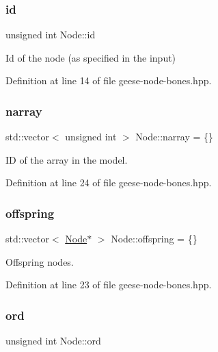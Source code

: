 \subsubsection{\texorpdfstring{id}{id}}
{\footnotesize\ttfamily unsigned int Node\+::id}



Id of the node (as specified in the input) 



Definition at line 14 of file geese-\/node-\/bones.\+hpp.

\mbox{\label{class_node_a9abaf3f1f5e9c5e383125946b04a15ac}} 
\subsubsection{\texorpdfstring{narray}{narray}}
{\footnotesize\ttfamily std\+::vector$<$ unsigned int $>$ Node\+::narray = \{\}}



ID of the array in the model. 



Definition at line 24 of file geese-\/node-\/bones.\+hpp.

\mbox{\label{class_node_a4e7e9c69da2575cad9c5fb7865dd42c7}} 
\subsubsection{\texorpdfstring{offspring}{offspring}}
{\footnotesize\ttfamily std\+::vector$<$ \hyperlink{class_node}{Node}$\ast$ $>$ Node\+::offspring = \{\}}



Offspring nodes. 



Definition at line 23 of file geese-\/node-\/bones.\+hpp.

\mbox{\label{class_node_ac58501488a47ad56989463668d062e8f}} 
\subsubsection{\texorpdfstring{ord}{ord}}
{\footnotesize\ttfamily unsigned int Node\+::ord}



